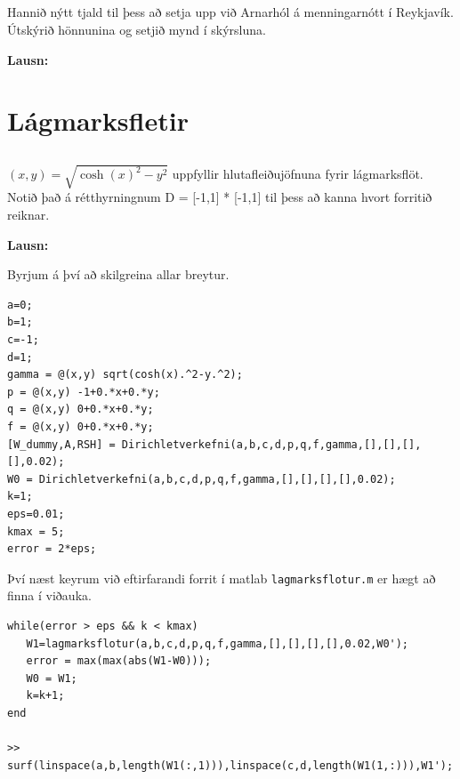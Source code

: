 \documentclass[11pt,a4paper,titlepage]{article}
\begin{document}
  
 \subsection{}
 Hannið nýtt tjald til þess að setja upp við Arnarhól á menningarnótt í Reykjavík. Útskýrið hönnunina og setjið mynd í skýrsluna.
 
 \par
 \textbf{Lausn:}\par
 
 
 
\section{Lágmarksfletir}

\subsection{}
$(x,y)= \sqrt{\cosh (x)^{2}-y^{2}}$  uppfyllir hlutafleiðujöfnuna fyrir lágmarksflöt. Notið það á rétthyrningnum D = [-1,1] * [-1,1] til þess að kanna hvort forritið reiknar.

\par
\textbf{Lausn:}\par
Byrjum á því að skilgreina allar breytur. 
\begin{verbatim}
a=0;
b=1;
c=-1;
d=1;
gamma = @(x,y) sqrt(cosh(x).^2-y.^2);
p = @(x,y) -1+0.*x+0.*y;
q = @(x,y) 0+0.*x+0.*y;
f = @(x,y) 0+0.*x+0.*y;
[W_dummy,A,RSH] = Dirichletverkefni(a,b,c,d,p,q,f,gamma,[],[],[],[],0.02);
W0 = Dirichletverkefni(a,b,c,d,p,q,f,gamma,[],[],[],[],0.02);
k=1;
eps=0.01;
kmax = 5;
error = 2*eps;
\end{verbatim}

Því næst keyrum við eftirfarandi forrit í matlab \verb|lagmarksflotur.m| er hægt að finna í viðauka.  
\begin{verbatim}
while(error > eps && k < kmax)
   W1=lagmarksflotur(a,b,c,d,p,q,f,gamma,[],[],[],[],0.02,W0');
   error = max(max(abs(W1-W0)));
   W0 = W1;
   k=k+1;
end

>> surf(linspace(a,b,length(W1(:,1))),linspace(c,d,length(W1(1,:))),W1');
\end{verbatim}
\end{document}
